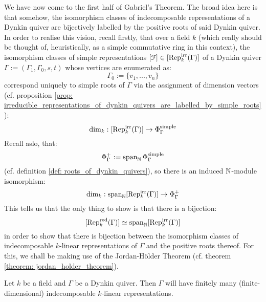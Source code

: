                 We have now come to the first half of Gabriel's Theorem. The broad idea here is that somehow, the isomorphism classes of indecomposable representations of a Dynkin quiver are bijectively labelled by the positive roots of said Dynkin quiver. In order to realise this vision, recall firstly, that over a field $k$ (which really should be thought of, heuristically, as a simple commutative ring in this context), the isomorphism classes of simple representations $[\mathcal{F}] \in [\mathrm{Rep}_k^{\mathrm{irr}}(\Gamma)]$ of a Dynkin quiver $\Gamma := (\Gamma_1, \Gamma_0, s, t)$ whose vertices are enumerated as:
                    $$\Gamma_0 := \{v_1, ..., v_n\}$$
                correspond uniquely to simple roots of $\Gamma$ via the assignment of dimension vectors (cf. proposition \ref{prop: irreducible_representations_of_dynkin_quivers_are_labelled_by_simple_roots}):
                    $$\dim_k: [\mathrm{Rep}_k^{\mathrm{irr}}(\Gamma)] \to \Phi_{\Gamma}^{\mathrm{simple}}$$
                Recall aslo, that:
                    $$\Phi_{\Gamma}^+ := \operatorname{span}_{\mathbb{N}} \Phi_{\Gamma}^{\mathrm{simple}}$$
                (cf. definition \ref{def: roots_of_dynkin_quivers}), so there is an induced $\mathbb{N}$-module isomorphism:
                    $$\dim_k: \operatorname{span}_{\mathbb{N}} [\mathrm{Rep}_k^{\mathrm{irr}}(\Gamma)] \to \Phi_{\Gamma}^+$$
                This tells us that the only thing to show is that there is a bijection:
                    $$[\mathrm{Rep}_k^{\mathrm{red}}(\Gamma)] \simeq \operatorname{span}_{\mathbb{N}} [\mathrm{Rep}_k^{\mathrm{irr}}(\Gamma)]$$
                in order to show that there is bijection between the isomorphism classes of indecomposable $k$-linear representations of $\Gamma$ and the positive roots thereof. For this, we shall be making use of the Jordan-H\"older Theorem (cf. theorem \ref{theorem: jordan_holder_theorem}).
                \begin{theorem} \label{theorem: gabriel_theorem_dynkin_implies_representation_finite}
                    Let $k$ be a field and $\Gamma$ be a Dynkin quiver. Then $\Gamma$ will have finitely many (finite-dimensional) indecomposable $k$-linear representations.
                \end{theorem}
